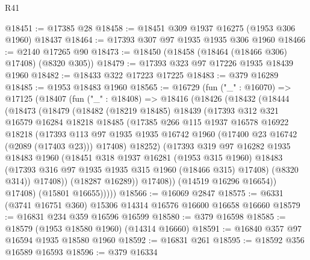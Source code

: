 \begin{lexlean}{R41}
\begin{coremodule}
@18451 := @17385 @28
@18458 := @18451 @309 @1937 @16275 (@1953 @306 @1960) @18437
@18464 := @17393 @307 @97 @1935 @1935 @306 @1960
@18466 := @2140 @17265 @90
@18473 := @18450 (@18458 (@18464 (@18466 @306) @17408) (@8320 @305))
@18479 := @17393 @323 @97 @17226 @1935 @18439 @1960
@18482 := @18433 @322 @17223 @17225
@18483 := @379 @16289
@18485 := @1953 @18483 @1960
@18565 := @16729
    (fun ("_" : @16070) =>
    @17125
      (@18407
        (fun ("_" : @18408) =>
        @18416
          (@18426
            (@18432
              (@18444
                (@18473
                  (@18479
                    (@18482
                      (@18219 @18485)
                      @18439
                      (@17393
                        @312
                        @321
                        @16579
                        @16284
                        @18218
                        @18485
                        (@17385
                          @266
                          @115
                          @1937
                          @16578
                          @16922
                          @18218
                          (@17393
                            @113
                            @97
                            @1935
                            @1935
                            @16742
                            @1960
                            (@17400 @23 @16742 (@2089 (@17403 @23)))
                            @17408)
                          @18252)
                        (@17393
                          @319
                          @97
                          @16282
                          @1935
                          @18483
                          @1960
                          (@18451
                            @318
                            @1937
                            @16281
                            (@1953 @315 @1960)
                            @18483
                            (@17393 @316 @97 @1935 @1935 @315 @1960 (@18466 @315) @17408)
                            (@8320 @314))
                          @17408))
                      (@18287 @16289))
                    @17408))
                (@14519 @16296 @16654))
              @17408)
            (@15801 @16655)))))
@18566 := @16069 @2847
@18575 := @6331 (@3741 @16751 @360) @15306 @14314 @16576 @16600 @16658 @16660
@18579 := @16831 @234 @359 @16596 @16599
@18580 := @379 @16598
@18585 := @18579 (@1953 @18580 @1960) (@14314 @16660)
@18591 := @16840 @357 @97 @16594 @1935 @18580 @1960
@18592 := @16831 @261
@18595 := @18592 @356 @16589 @16593
@18596 := @379 @16334

\end{coremodule}
\end{lexlean}
